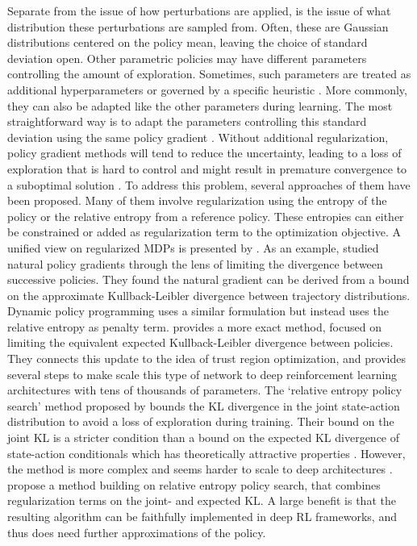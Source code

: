 \label{ssec:policydist}
Separate from the issue of how perturbations are applied, is the issue of what distribution these perturbations are sampled from. Often, these are Gaussian distributions centered on the policy mean, leaving the choice of standard deviation open. Other parametric policies may have different parameters controlling the amount of exploration.
Sometimes, such parameters are treated as additional hyperparameters  or governed by a specific heuristic .
More commonly, they can also be adapted like the other parameters during learning. The most straightforward way is to adapt the parameters controlling this standard deviation using the same policy gradient . Without additional regularization, policy gradient methods will tend to reduce the uncertainty, leading to a loss of exploration that is hard to control and might result in premature convergence to a suboptimal solution .   
To address this problem, several approaches of them have been proposed. Many of them involve regularization using the entropy of the policy or the relative entropy from a reference policy. These entropies can either be constrained or added as regularization term to the optimization objective. A unified view on regularized MDPs is presented by .
As an example,  studied   natural policy gradients through the lens of limiting the divergence between successive policies. They found the natural gradient can be derived from a bound on the approximate Kullback-Leibler divergence between trajectory distributions. 
Dynamic policy programming  uses a similar formulation but instead uses the relative entropy as penalty term. 
 provides a more exact method, focused on limiting the equivalent expected Kullback-Leibler divergence between policies. They  connects this update to the idea of trust region optimization, and provides several steps to make scale this type of network to deep reinforcement learning architectures with tens of thousands of parameters. 
The `relative entropy policy search' method proposed by  bounds the KL divergence in the joint state-action distribution to avoid a loss of exploration during training. Their bound on the joint KL is a stricter condition than a bound on the expected KL divergence of state-action conditionals which has theoretically attractive properties . However, the method is more complex and seems harder to scale to deep architectures .  propose a method building on relative entropy policy search, that combines regularization terms on the joint- and expected KL. A large benefit is that the resulting algorithm can be faithfully implemented in deep RL frameworks, and thus does need further approximations of the policy. 
